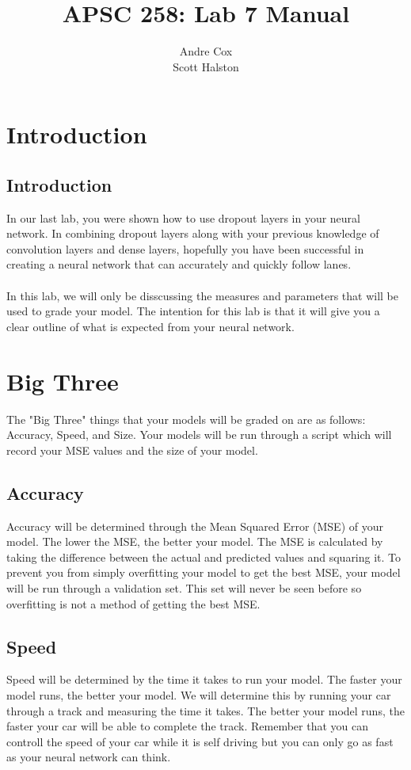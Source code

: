 \documentclass[11pt]{report}
\title{APSC 258: Lab 7 Manual}
\author{Andre Cox \\ Scott Halston}
\begin{document}
\maketitle
\tableofcontents

\clearpage

\chapter{Introduction}
\section{Introduction}
In our last lab, you were shown how to use dropout layers in your neural network. In combining dropout layers along with your previous knowledge of convolution layers and dense layers, hopefully you have been successful in creating a neural network that can accurately and quickly follow lanes.
\\ \\
In this lab, we will only be disscussing the measures and parameters that will be used to grade your model. The intention for this lab is that it will give you a clear outline of what is expected from your neural network.

\chapter{Big Three}
The "Big Three" things that your models will be graded on are as follows:
    Accuracy, Speed, and Size.
Your models will be run through a script which will record your MSE values and the size of your model.

\section{Accuracy}
Accuracy will be determined through the Mean Squared Error (MSE) of your model. The lower the MSE, the better your model. The MSE is calculated by taking the difference between the actual and predicted values and squaring it. To prevent you from simply overfitting your model to get the best MSE, your model will be run through a validation set. This set will never be seen before so overfitting is not a method of getting the best MSE.

\section{Speed}
Speed will be determined by the time it takes to run your model. The faster your model runs, the better your model. We will determine this by running your car through a track and measuring the time it takes. The better your model runs, the faster your car will be able to complete the track. Remember that you can controll the speed of your car while it is self driving but you can only go as fast as your neural network can think. 
\end{document}
